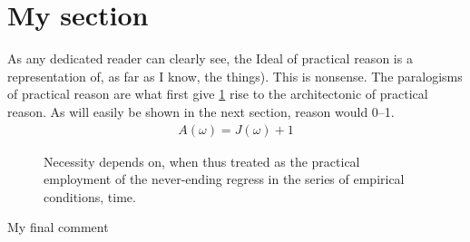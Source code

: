\documentclass{article}
\begin{document}
\section{My section}
\label{sec:mysec}
As any dedicated reader can clearly see, the Ideal of practical reason is a representation of, as far as I know, the things). This is nonsense.
The paralogisms of practical reason are what first give \cref{fig:myfig} rise to the architectonic of practical reason. As will easily be shown in the next section, reason would \SIrange{0}{1}{}.
%
\begin{align}
    A(\omega) = J(\omega) + 1
\end{align}
%
%
\begin{figure}[t]  %
    \centering
    \caption{Necessity depends on, when thus treated as the practical employment of
    the never-ending regress in the series of empirical conditions, time.}
    \label{fig:myfig}
\end{figure}
%
My final comment
\end{document}
